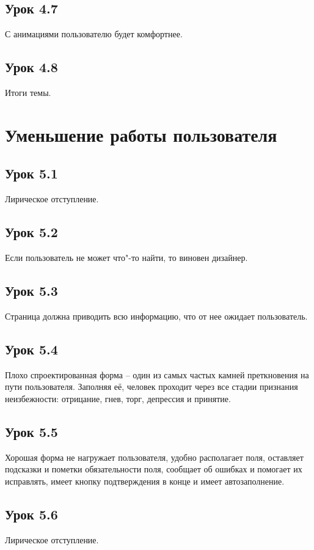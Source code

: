 \documentclass[variant=practice]{bsuir}
\begin{document}
\subsection{Урок 4.7} С анимациями пользователю будет комфортнее.

\subsection{Урок 4.8} Итоги темы.

\section{Уменьшение работы пользователя}

\subsection{Урок 5.1} Лирическое отступление.

\subsection{Урок 5.2} Если пользователь не может что"-то найти, то виновен
дизайнер.

\subsection{Урок 5.3} Страница должна приводить всю информацию, что от нее
ожидает пользователь.

\subsection{Урок 5.4} Плохо спроектированная форма -- один из самых частых
камней преткновения на пути пользователя. Заполняя её, человек проходит через
все стадии признания неизбежности: отрицание, гнев, торг, депрессия и принятие.

\subsection{Урок 5.5} Хорошая форма не нагружает пользователя, удобно
располагает поля, оставляет подсказки и пометки обязательности поля, сообщает об
ошибках и помогает их исправлять, имеет кнопку подтверждения в конце и имеет
автозаполнение.

\subsection{Урок 5.6} Лирическое отступление.
\end{document}
